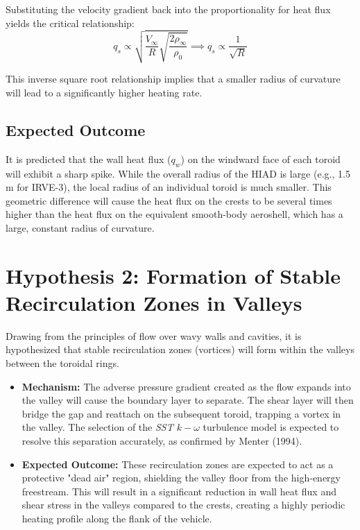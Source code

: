 Substituting the velocity gradient back into the proportionality for heat flux yields the critical relationship:
\begin{equation}
    q_s \propto \sqrt{\frac{V_{\infty}}{R} \sqrt{\frac{2 \rho_{\infty}}{\rho_{0}}}} \implies q_s \propto \frac{1}{\sqrt{R}}
\end{equation}

This inverse square root relationship implies that a smaller radius of curvature will lead to a significantly higher heating rate.

\subsection{Expected Outcome}
It is predicted that the wall heat flux ($q_w$) on the windward face of each toroid will exhibit a sharp spike. While the overall radius of the HIAD is large (e.g., 1.5 m for IRVE-3), the local radius of an individual toroid is much smaller. This geometric difference will cause the heat flux on the crests to be several times higher than the heat flux on the equivalent smooth-body aeroshell, which has a large, constant radius of curvature.

\section{Hypothesis 2: Formation of Stable Recirculation Zones in Valleys}
Drawing from the principles of flow over wavy walls and cavities, it is hypothesized that stable recirculation zones (vortices) will form within the valleys between the toroidal rings.

\begin{itemize}
    \item \textbf{Mechanism:} The adverse pressure gradient created as the flow expands into the valley will cause the boundary layer to separate. The shear layer will then bridge the gap and reattach on the subsequent toroid, trapping a vortex in the valley. The selection of the \textit{SST $k-\omega$} turbulence model is expected to resolve this separation accurately, as confirmed by Menter (1994).
    \item \textbf{Expected Outcome:} These recirculation zones are expected to act as a protective "dead air" region, shielding the valley floor from the high-energy freestream. This will result in a significant reduction in wall heat flux and shear stress in the valleys compared to the crests, creating a highly periodic heating profile along the flank of the vehicle.
\end{itemize}

